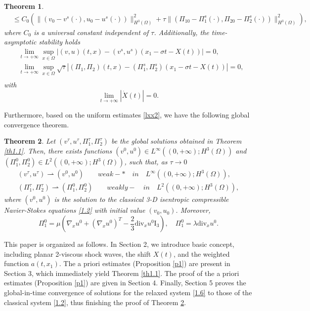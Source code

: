 \documentclass[10pt,reqno]{amsart}
\numberwithin{equation}{section}
\newtheorem{theorem}{Theorem}[section]
\newcommand{\ddiv}{\mathrm{div}}
\begin{document}
\begin{theorem}
\begin{equation}
\begin{aligned}
&\leq C_0\left(\|(v_0-v^s(\cdot), u_0-u^s(\cdot))\|^2_{H^3(\Omega)}
+\tau\|(\Pi_{10}-\Pi_1^s(\cdot), \Pi_{20}-\Pi_2^s(\cdot))\|^2_{H^3(\Omega)}\right),
\end{aligned}
\end{equation}
where $C_0$ is a universal constant independent of $\tau$. Additionally, the time-asymptotic stability holds
\begin{equation}\label{jjwdx}
\begin{aligned}
&\lim\limits_{t\rightarrow+\infty}\sup\limits_{x\in\Omega}|(v, u)(t,x)-(v^s, u^s)(x_1-\sigma t-X(t))|=0,\\
&\lim\limits_{t\rightarrow+\infty}\sup\limits_{x\in\Omega}\sqrt{\tau}|(\Pi_1, \Pi_2)(t,x)-(\Pi_1^s, \Pi_2^s)(x_1-\sigma t-X(t))|=0,\\
\end{aligned}
\end{equation}
with
\begin{equation}\label{1.11}
\lim\limits_{t\rightarrow+\infty}|\dot{X}(t)|=0.
\end{equation}
\end{theorem}

Furthermore, based on the uniform estimates \eqref{lxx2}, we have the following global convergence theorem.
\begin{theorem}\label{th1.2}
Let $(v^{\tau}, u^{\tau}, \Pi_1^{\tau}, \Pi_2^{\tau})$ be the global solutions obtained in Theorem \ref{th1.1}. Then, there exists functions $(v^0 ,u^0)\in L^{\infty}\left((0, +\infty);H^3(\Omega)\right)$ and $(\Pi_1^0, \Pi_2^0)\in L^2\left((0, +\infty);H^3(\Omega)\right)$, such that, as $\tau\rightarrow0$
\begin{align*}
(v^{\tau}, u^{\tau})\rightharpoonup (v^0, u^0) \qquad weak-*\quad in \quad L^{\infty}\left((0, +\infty);H^3(\Omega)\right),\\
(\Pi_1^{\tau}, \Pi_2^{\tau})\rightharpoonup (\Pi_1^0, \Pi_2^0) \qquad weakly- \quad in \quad L^2\left((0, +\infty);H^3(\Omega)\right),
\end{align*}
where $(v^0, u^0)$ is the solution to the classical 3-D isentropic compressible Navier-Stokes equations \eqref{1.2} with initial value $(v_0, u_0)$. Moreover,
\[
\Pi_1^0=\mu\left(\nabla_x u^0+(\nabla_x u^0)^T-\frac{2}{3}\ddiv_x u^0\mathrm I_3\right),\quad
\Pi_1^0=\lambda \ddiv_x u^0.
\]
\end{theorem}

This paper is organized as follows. In  Section 2, we  introduce basic concept, including planar 2-viscous shock waves, the shift $X(t)$, and the weighted function $a(t, x_1)$. The a priori estimates (Proposition \ref{p1}) are present in Section 3,  which immediately yield Theorem \ref{th1.1}.  The  proof of  the a priori estimates (Proposition \ref{p1}) are given in Section 4. Finally, Section 5 proves the global-in-time convergence of solutions for the relaxed system \eqref{1.6} to those of the classical system \eqref{1.2}, thus finishing the proof of Theorem \ref{th1.2}.
\end{document}
